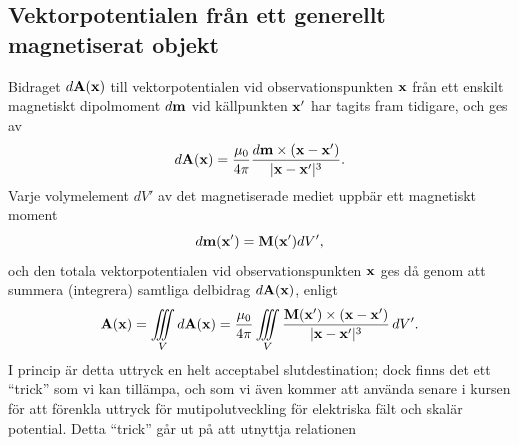 \subsection{Vektorpotentialen fr{\aa}n ett generellt magnetiserat objekt}
\noindent
Bidraget $d{\bf A}({\bf x})$ till vektorpotentialen vid observationspunkten
${\bf x}$ fr{\aa}n ett enskilt magnetiskt dipolmoment $d{\bf m}$ vid
k{\"a}llpunkten ${\bf x}'$ har tagits fram tidigare, och ges
av
$$
  d{\bf A}({\bf x})={{\mu_0}\over{4\pi}}
     {{d{\bf m}\times({\bf x}-{\bf x}')}\over{|{\bf x}-{\bf x}'|^3}}.
$$
Varje volymelement $dV'$ av det magnetiserade mediet uppb{\"a}r ett magnetiskt
moment
$$
  d{\bf m}({\bf x}')={\bf M}({\bf x}')dV',
$$
och den totala vektorpotentialen vid observationspunkten ${\bf x}$ ges d{\aa}
genom att summera (integrera) samtliga delbidrag $d{\bf A}({\bf x})$, enligt
$$
  {\bf A}({\bf x}) = \iiint_V d{\bf A}({\bf x})
  ={{\mu_0}\over{4\pi}}
     \iiint_V{{{\bf M}({\bf x}')\times({\bf x}-{\bf x}')}
                       \over{|{\bf x}-{\bf x}'|^3}}\,dV'.
$$
I princip {\"a}r detta uttryck en helt acceptabel slutdestination; dock finns
det ett ``trick'' som vi kan till{\"a}mpa, och som vi {\"a}ven kommer att
anv{\"a}nda senare i kursen f{\"o}r att f{\"o}renkla uttryck f{\"o}r
mutipolutveckling f{\"o}r elektriska f{\"a}lt och skal{\"a}r potential.
Detta ``trick'' g{\aa}r ut p{\aa} att utnyttja relationen
